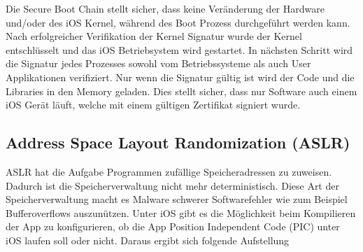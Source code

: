 Die Secure Boot Chain stellt sicher, dass keine Veränderung der Hardware und/oder des iOS Kernel, während des Boot Prozess durchgeführt werden kann. Nach erfolgreicher Verifikation der Kernel Signatur wurde der Kernel entschlüsselt und das iOS Betriebsystem wird gestartet. In nächsten Schritt wird die Signatur jedes Prozesses sowohl vom Betriebssysteme als auch User Applikationen verifiziert. Nur wenn die Signatur gültig ist wird der Code und die Libraries in den Memory geladen. Dies stellt sicher, dass nur Software auch einem iOS Gerät läuft, welche mit einem gültigen Zertifikat signiert wurde. \cite{Apple[4], Apple[5], Apple[6]}






\subsection{Address Space Layout Randomization (ASLR)}
\label{sec:ASLR}

ASLR hat die Aufgabe Programmen zufällige Speicheradressen zu zuweisen. Dadurch ist die Speicherverwaltung nicht mehr deterministisch. Diese Art der Speicherverwaltung macht es Malware schwerer Softwarefehler wie zum Beispiel Bufferoverflows auszunützen.
Unter iOS gibt es die Möglichkeit beim Kompilieren der App zu konfigurieren, ob die App \glqq Position Independent Code (PIC) \grqq{} unter iOS laufen soll oder nicht. Daraus ergibt sich folgende Aufstellung


